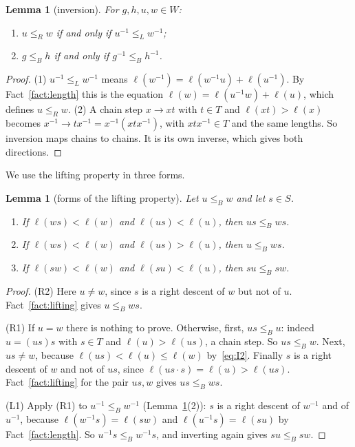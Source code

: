 \documentclass[11pt]{amsart}
\newtheorem{lemma}[theorem]{Lemma}
\theoremstyle{definition}
\theoremstyle{remark}
\numberwithin{equation}{section}
\newcommand{\leR}{\le_R}
\newcommand{\leL}{\le_L}
\newcommand{\leB}{\le_B}
\begin{document}
\begin{lemma}[inversion]\label{lem:inverse}
For \(g,h,u,w\in W\):
\begin{enumerate}
\item \(u\leR w\) if and only if \(u^{-1}\leL w^{-1}\);
\item \(g\leB h\) if and only if \(g^{-1}\leB h^{-1}\).
\end{enumerate}
\end{lemma}

\begin{proof}
(1) \(u^{-1}\leL w^{-1}\) means \(\ell(w^{-1})=\ell(w^{-1}u)+\ell(u^{-1})\). By Fact~\ref{fact:length} this is the equation \(\ell(w)=\ell(u^{-1}w)+\ell(u)\), which defines \(u\leR w\).
(2) A chain step \(x\to xt\) with \(t\in T\) and \(\ell(xt)>\ell(x)\) becomes \(x^{-1}\to tx^{-1}=x^{-1}(xtx^{-1})\), with \(xtx^{-1}\in T\) and the same lengths. So inversion maps chains to chains. It is its own inverse, which gives both directions.
\end{proof}

We use the lifting property in three forms.

\begin{lemma}[forms of the lifting property]\label{lem:lift}
Let \(u\leB w\) and let \(s\in S\).
\begin{enumerate}
\item[(R1)] If \(\ell(ws)<\ell(w)\) and \(\ell(us)<\ell(u)\), then \(us\leB ws\).
\item[(R2)] If \(\ell(ws)<\ell(w)\) and \(\ell(us)>\ell(u)\), then \(u\leB ws\).
\item[(L1)] If \(\ell(sw)<\ell(w)\) and \(\ell(su)<\ell(u)\), then \(su\leB sw\).
\end{enumerate}
\end{lemma}

\begin{proof}
(R2) Here \(u\neq w\), since \(s\) is a right descent of \(w\) but not of \(u\). Fact~\ref{fact:lifting} gives \(u\leB ws\).

(R1) If \(u=w\) there is nothing to prove. Otherwise, first, \(us\leB u\): indeed \(u=(us)s\) with \(s\in T\) and \(\ell(u)>\ell(us)\), a chain step. So \(us\leB w\). Next, \(us\neq w\), because \(\ell(us)<\ell(u)\le\ell(w)\) by~\eqref{eq:I2}. Finally \(s\) is a right descent of \(w\) and not of \(us\), since \(\ell(us\cdot s)=\ell(u)>\ell(us)\). Fact~\ref{fact:lifting} for the pair \(us,w\) gives \(us\leB ws\).

(L1) Apply (R1) to \(u^{-1}\leB w^{-1}\) (Lemma~\ref{lem:inverse}(2)): \(s\) is a right descent of \(w^{-1}\) and of \(u^{-1}\), because \(\ell(w^{-1}s)=\ell(sw)\) and \(\ell(u^{-1}s)=\ell(su)\) by Fact~\ref{fact:length}. So \(u^{-1}s\leB w^{-1}s\), and inverting again gives \(su\leB sw\).
\end{proof}
\end{document}
